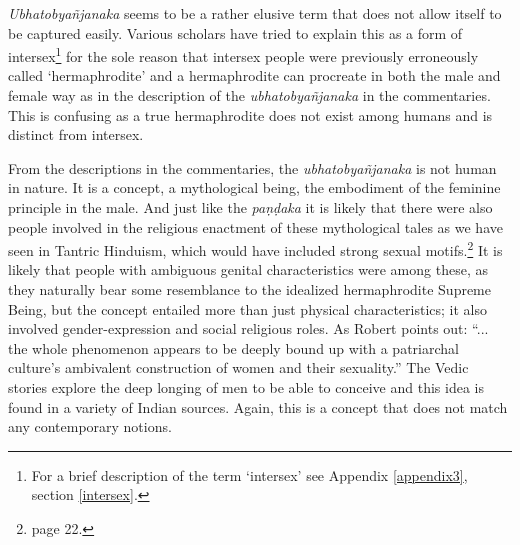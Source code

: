 {\em Ubhatob­yañ­janaka} seems to be a rather elusive term that does not allow itself to be captured easily. Various scholars have tried to explain this as a form of intersex\footnote{For a brief description of the term `intersex' see Appendix \ref{appendix3}, section \ref{intersex}.} for the sole reason that intersex people were previously erroneously called `hermaphrodite' and a hermaphrodite can procreate in both the male and female way as in the description of the {\em ubhatob­yañ­janaka} in the commentaries. This is confusing as a true hermaphrodite does not exist among humans and is distinct from intersex. 

From the descriptions in the commentaries, the {\em ubhatob­yañ­janaka} is not human in nature. It is a concept, a mythological being, the embodiment of the feminine principle in the male. And just like the {\em paṇḍaka} it is likely that there were also people involved in the religious enactment of these mythological tales as we have seen in Tantric Hinduism, which would have included strong sexual motifs.\footnote{\cite{nanda} page 22.} It is likely that people with ambiguous genital characteristics were among these, as they naturally bear some resemblance to the idealized hermaphrodite Supreme Being, but the concept entailed more than just physical characteristics; it also involved gender-expression and social religious roles. As Robert \cite{goldman} points out: ``... the whole phenomenon appears to be deeply bound up with a patriarchal culture's ambivalent construction of women and their sexuality.'' The Vedic stories explore the deep longing of men to be able to conceive and this idea is found in a variety of Indian sources. Again, this is a concept that does not match any contemporary notions.

